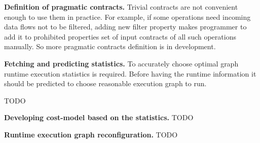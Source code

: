 \textbf{Definition of pragmatic contracts.}
Trivial contracts are not convenient enough to use them in practice.
For example, if some operations need incoming data flows not to be filtered, adding new filter property makes programmer to add it to prohibited properties set of input contracts of all such operations manually.
So more pragmatic contracts definition is in development.

\textbf{Fetching and predicting statistics.}
To accurately choose optimal graph runtime execution statistics is required.
Before having the runtime information it should be predicted to choose reasonable execution graph to run.




TODO

\textbf{Developing cost-model based on the statistics.}
TODO

\textbf{Runtime execution graph reconfiguration.}
TODO










